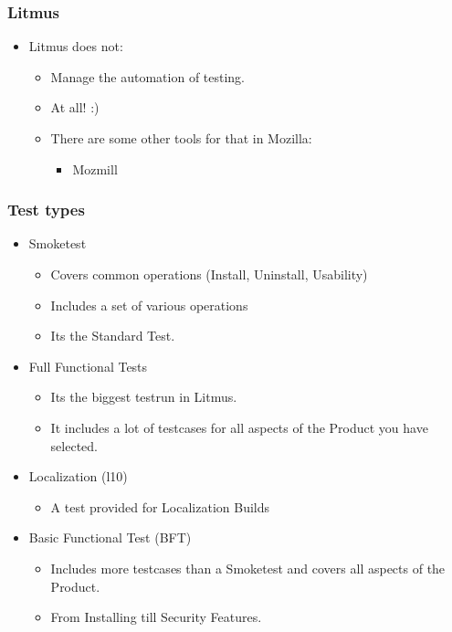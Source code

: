 \documentclass{beamer}
\begin{document}

\begin{frame}
\frametitle{Litmus}
 \begin{itemize}
    \item Litmus does not:
       \begin{itemize}
       \item Manage the automation of testing.
       \item At all! :)
       \item There are some other tools for that in Mozilla:
          \begin{itemize} 
          \item Mozmill
          \end{itemize}
       \end{itemize}
 \end{itemize}

\end{frame}




\begin{frame}
\frametitle{Test types}
  \begin{itemize}

  \item Smoketest 
       \begin{itemize}
       \item Covers common operations (Install, Uninstall, Usability)
       \item Includes a set of various operations
       \item Its the Standard Test.
       \end{itemize}
  \item Full Functional Tests
       \begin{itemize}
       \item Its the biggest testrun in Litmus. 
       \item It includes a lot of testcases for all aspects of the Product you have selected.
       \end{itemize}
  \item Localization (l10)
       \begin{itemize}
       \item A test provided for Localization Builds
       \end{itemize}
  \item Basic Functional Test (BFT)
       \begin{itemize}
       \item Includes more testcases than a Smoketest and covers all aspects of the Product.
       \item From Installing till Security Features.
       \end{itemize}

  \end{itemize}
\end{frame}
\end{document}
